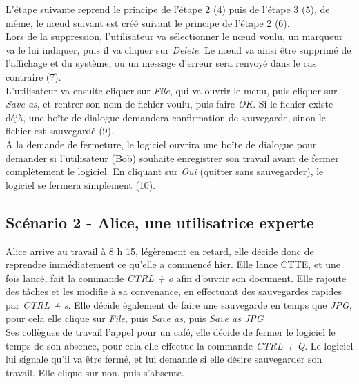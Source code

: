 \documentclass[12pt, a4paper]{article}
\begin{document}
L'étape suivante reprend le principe de l'étape 2 (4) puis de l'étape 3 (5), de même, le nœud suivant est créé suivant le principe de l'étape 2 (6).\\ 


Lors de la suppression, l'utilisateur va sélectionner le nœud voulu, un marqueur va le lui indiquer, puis il va cliquer sur \emph{Delete}. Le nœud va ainsi être supprimé de l'affichage et du système, ou un message d'erreur sera renvoyé dans le cas contraire (7).\\ 


L'utilisateur va ensuite cliquer sur \emph{File}, qui va ouvrir le menu, puis cliquer sur \emph{Save as}, et rentrer son nom de fichier voulu, puis faire \emph{OK}. Si le fichier existe déjà, une boîte de dialogue demandera confirmation de sauvegarde, sinon le fichier est sauvegardé (9).\\ 


A la demande de fermeture, le logiciel ouvrira une boîte de dialogue pour demander si l'utilisateur (Bob) souhaite enregistrer son travail avant de fermer complètement le logiciel. En cliquant sur \emph{Oui} (quitter sans sauvegarder), le logiciel se fermera simplement (10). \\ \newpage
\textcolor{NavyBlue}{\subsection{Scénario 2 - Alice, une utilisatrice experte}}


Alice arrive au travail à 8 h 15, légèrement en retard, elle décide donc de reprendre immédiatement ce qu'elle a commencé hier. Elle lance CTTE, et une fois lancé, fait la commande \emph{CTRL + o} afin d'ouvrir son document. Elle rajoute des tâches et les modifie à sa convenance, en effectuant des sauvegardes rapides par \emph{CTRL + s}. Elle décide également de faire une sauvegarde en temps que \emph{JPG}, pour cela elle clique sur \emph{File}, puis \emph{Save as}, puis \emph{Save as JPG} \\


Ses collègues de travail l'appel pour un café, elle décide de fermer le logiciel le temps de son absence, pour cela elle effectue la commande \emph{CTRL + Q}. Le logiciel lui signale qu'il va être fermé, et lui demande si elle désire sauvegarder son travail. Elle clique sur non, puis s'absente.\\
\end{document}
